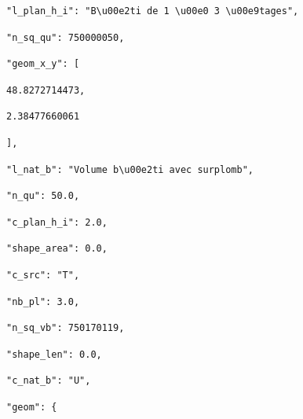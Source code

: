 \documentclass[
  11pt,
  french,
]{article}
\begin{document}
\begin{tcolorbox}[title= Chargement du jeu de données sous un format hiérarchisé dans Python ,colback=boitecode]
\begin{lstlisting}[style=code]
            "l_plan_h_i": "B\u00e2ti de 1 \u00e0 3 \u00e9tages",\end{lstlisting}
\begin{lstlisting}[style=code]
            "n_sq_qu": 750000050,\end{lstlisting}
\begin{lstlisting}[style=code]
            "geom_x_y": [\end{lstlisting}
\begin{lstlisting}[style=code]
                48.8272714473,\end{lstlisting}
\begin{lstlisting}[style=code]
                2.38477660061\end{lstlisting}
\begin{lstlisting}[style=code]
            ],\end{lstlisting}
\begin{lstlisting}[style=code]
            "l_nat_b": "Volume b\u00e2ti avec surplomb",\end{lstlisting}
\begin{lstlisting}[style=code]
            "n_qu": 50.0,\end{lstlisting}
\begin{lstlisting}[style=code]
            "c_plan_h_i": 2.0,\end{lstlisting}
\begin{lstlisting}[style=code]
            "shape_area": 0.0,\end{lstlisting}
\begin{lstlisting}[style=code]
            "c_src": "T",\end{lstlisting}
\begin{lstlisting}[style=code]
            "nb_pl": 3.0,\end{lstlisting}
\begin{lstlisting}[style=code]
            "n_sq_vb": 750170119,\end{lstlisting}
\begin{lstlisting}[style=code]
            "shape_len": 0.0,\end{lstlisting}
\begin{lstlisting}[style=code]
            "c_nat_b": "U",\end{lstlisting}
\begin{lstlisting}[style=code]
            "geom": {\end{lstlisting}
\begin{lstlisting}[style=code]

\end{lstlisting}
\end{tcolorbox}
\end{document}

